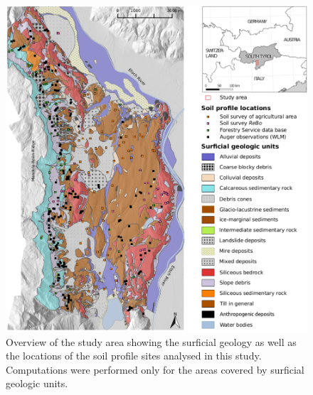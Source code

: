 \documentclass[preprint,12pt,authoryear]{elsarticle}
\begin{document}
 \begin{figure}[ht!]
\includegraphics[width=\textwidth,angle=0]{studyarea_page_cropped.pdf}
\caption{Overview of the study area showing the surficial geology as well as the locations of the soil profile sites analysed in this study. Computations  were performed only for the areas covered by surficial geologic units.  }
\label{fig:studyarea}
\end{figure}
\end{document}
